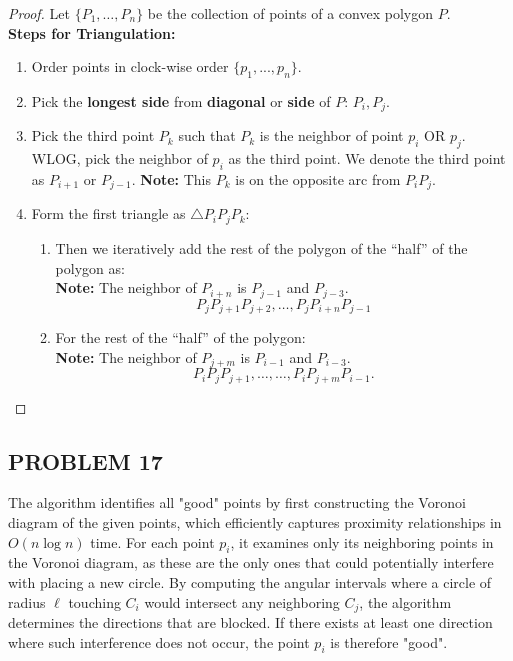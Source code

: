 \documentclass{article}
\begin{document}
\begin{proof}
    Let $\{P_1, \dots, P_n\}$ be the collection of points of a convex polygon $P$.
    \\
    \textbf{Steps for Triangulation: }

    \begin{enumerate}
        \item Order points in clock-wise order $\{p_1, ..., p_n\}$.

        \item Pick the \textbf{longest side} from \textbf{diagonal} or \textbf{side} of $P$: $P_i, P_j$.

        \item Pick the third point $P_k$ such that $P_k$ is the neighbor of point $p_i$ OR $p_j$. WLOG, 
        pick the neighbor of $p_i$ as the third point. We denote the third point as $P_{i+1}$ or $P_{j-1}$.
        \textbf{Note:} This $P_k$ is on the opposite arc from $P_i P_j$.
        \item Form the first triangle as $\triangle P_i P_j P_k$:
        \begin{enumerate}
            \item Then we iteratively add the rest of the polygon of the ``half'' of the polygon as:
            \\
            \textbf{Note:} The neighbor of $P_{i + n}$ is $P_{j - 1}$ and $P_{j - 3}$.
            \[
                P_j P_{j+1} P_{j+2}, \dots, P_{j} P_{i + n} P_{j-1}
            \]

            \item For the rest of the ``half'' of the polygon:
            \\
            \textbf{Note:} The neighbor of $P_{j + m}$ is $P_{i - 1}$ and $P_{i - 3}$.
            \[
                P_i P_j P_{j+1}, \dots, \dots, P_{i} P_{j + m} P_{i-1}.
            \]
        \end{enumerate}
\end{enumerate}

\end{proof}

\subsection*{PROBLEM 17}
The algorithm identifies all "good" points by first constructing the Voronoi diagram of the given points, which efficiently captures proximity relationships in \( O(n \log n) \) time. 
For each point \( p_i \), it examines only its neighboring points in the Voronoi diagram, as these are the only ones that could potentially interfere with placing a new circle. By computing the angular intervals where a circle of radius \( \ell \) touching \( C_i \) would intersect any neighboring \( C_j \), 
the algorithm determines the directions that are blocked. If there exists at least one direction where such interference does not occur, the point \( p_i \) is therefore "good".
\end{document}
